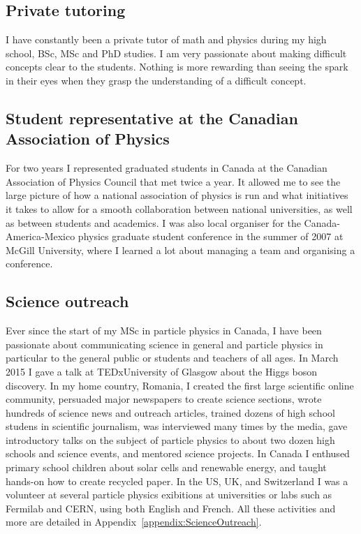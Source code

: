 \documentclass[12pt]{article} %
\begin{document}
\subsection{Private tutoring}

I have constantly been a private tutor of math and physics during my high school, BSc, MSc and PhD studies. I am very passionate about making difficult concepts clear to the students. Nothing is more rewarding than seeing the spark in their eyes when they grasp the understanding of a difficult concept. 

\subsection{Student representative at the Canadian Association of Physics}

For two years I represented graduated students in Canada at the Canadian Association of Physics Council that met twice a year. It allowed me to see the large picture of how a national association of physics is run and what initiatives it takes to allow for a smooth collaboration between national universities, as well as between students and academics. I was also local organiser for the Canada-America-Mexico physics graduate student conference in the summer of 2007 at McGill University, where I learned a lot about managing a team and organising a conference. 

\subsection{Science outreach}

Ever since the start of my MSc in particle physics in Canada, I have been passionate about communicating science in general and particle physics in particular to the general public or students and teachers of all ages. In March 2015 I gave a talk at TEDxUniversity of Glasgow about the Higgs boson discovery. In my home country, Romania, I created the first large scientific online community, persuaded major newspapers to create science sections, wrote hundreds of science news and outreach articles, trained dozens of high school studens in scientific journalism, was interviewed many times by the media, gave introductory talks on the subject of particle physics to about two dozen high schools and science events, and mentored science projects. In Canada I enthused primary school children about solar cells and renewable energy, and taught hands-on how to create recycled paper. In the US, UK, and Switzerland I was a volunteer at several particle physics exibitions at universities or labs such as Fermilab and CERN, using both English and French. All these activities and more are detailed in Appendix~\ref{appendix:ScienceOutreach}. 
\end{document}
